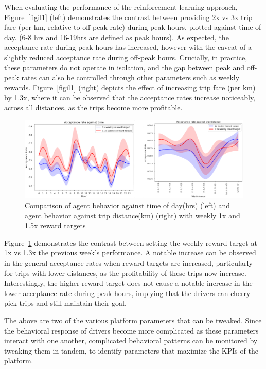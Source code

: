 \documentclass[runningheads]{llncs}
\begin{document}
When evaluating the performance of the reinforcement learning approach, Figure~\ref{figil1} (left) demonstrates the contrast between providing 2x vs 3x trip fare (per km, relative to off-peak rate) during peak hours, plotted against time of day. (6-8 hrs and 16-19hrs are defined as peak hours). As expected, the acceptance rate during peak hours has increased, however with the caveat of a slightly reduced acceptance rate during off-peak hours. Crucially, in practice, these parameters do not operate in isolation, and the gap between peak and off-peak rates can also be controlled through other parameters such as weekly rewards. Figure~\ref{figil1} (right) depicts the effect of increasing trip fare (per km) by 1.3x, where it can be observed that the acceptance rates increase noticeably, across all distances, as the trips become more profitable. 

\begin{figure}[h!]
\centering
\includegraphics[width=0.97\columnwidth]{il-rl2.png} \caption{Comparison of agent behavior against time of day(hrs) (left) and agent behavior against trip distance(km) (right) with weekly 1x and 1.5x reward targets}
\label{figil2}
\end{figure}
 
Figure~\ref{figil2} demonstrates the contrast between setting the weekly reward target at  1x vs 1.3x the previous week’s performance. A notable increase can be observed in the general acceptance rates when reward targets are increased, particularly for trips with lower distances, as the profitability of these trips now increase. Interestingly, the higher reward target does not cause a notable increase in the lower acceptance rate during peak hours, implying that the drivers can cherry-pick trips and still maintain their goal. 

The above are two of the various platform parameters that can be tweaked. Since the behavioral response of drivers become more complicated as these parameters interact with one another, complicated behavioral patterns can be monitored by tweaking them in tandem, to identify parameters that maximize the KPIs of the platform.
\end{document}
